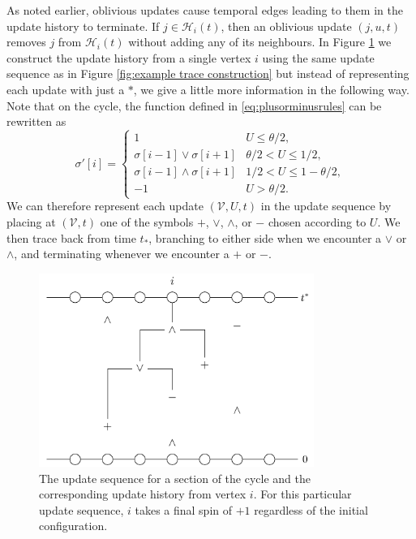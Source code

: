 	As noted earlier, oblivious updates cause temporal edges leading to them in the update history to terminate. If $j \in \mathcal{H}_i(t)$, then an oblivious update $(j, u, t)$ removes $j$ from $\mathcal{H}_i(t)$ without adding any of its neighbours. In Figure \ref{fig:example percolation construction oblivious} we construct the update history from a single vertex $i$ using the same update sequence as in Figure \ref{fig:example trace construction} but instead of representing each update with just a $*$, we give a little more information in the following way. Note that on the cycle, the function defined in \eqref{eq:plusorminusrules} can be rewritten as
	\begin{equation}
		\sigma'[i] = 
		\begin{cases}
			1 & U \leq \theta/2,\\
			\sigma[i-1] \vee \sigma[i+1] & \theta/2 < U \leq 1/2,\\
			\sigma[i-1] \wedge \sigma[i+1] & 1/2 < U \leq 1 - \theta/2,\\
			-1	& U > \theta/2.
		\end{cases}
	\end{equation}
	We can therefore represent each update $(\mathcal{V}, U, t)$ in the update sequence by placing at $(\mathcal{V}, t)$ one of the symbols $+$, $\vee$, $\wedge$, or $-$ chosen according to $U$. We then trace back from time $t_*$, branching to either side when we encounter a $\vee$ or $\wedge$, and terminating whenever we encounter a $+$ or $-$.

	\begin{figure}
		\centering
		\includegraphics[width = 0.8\textwidth]{Figures/IsingCouplingTime/example_percolation_construction_oblivious.pdf}
		\caption[The update sequence for a section of the cycle and the corresponding update history from vertex i]{The update sequence for a section of the cycle and the corresponding update history from vertex $i$. For this particular update sequence, $i$ takes a final spin of $+1$ regardless of the initial configuration.}
		\label{fig:example percolation construction oblivious}
	\end{figure}

